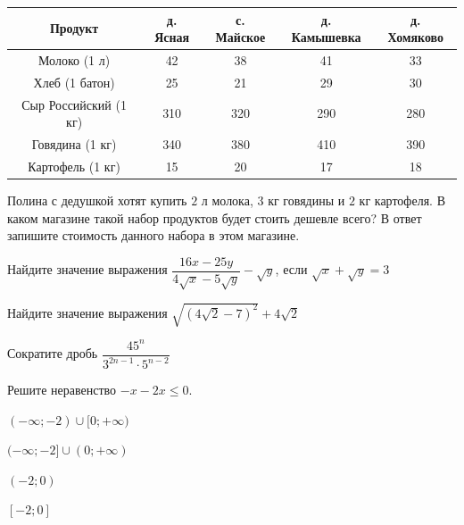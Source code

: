 \begin{class}[number=2]
\begin{listofex}
		\begin{center}
			\footnotesize
			\begin{tabular}{|c|c|c|c|c|}
				\hline
				\rowcolor{gray}\textbf{Продукт}&\textbf{д. Ясная}&\textbf{с. Майское}&\textbf{д. Камышевка}&\textbf{д. Хомяково}\\
				\hline
				Молоко (1 л)&42&38&41&33\\
				\hline
				Хлеб (1 батон)&25&21&29&30\\
				\hline
				Сыр Российский (1 кг)&310&320&290&280\\
				\hline
				Говядина (1 кг)&340&380&410&390\\
				\hline
				Картофель (1 кг)&15&20&17&18\\
				\hline
			\end{tabular}
		\end{center}
		Полина с дедушкой хотят купить \( 2 \) л молока, \( 3 \) кг говядины и \( 2 \) кг картофеля. В каком магазине такой набор продуктов будет стоить дешевле всего? В ответ запишите стоимость данного набора в этом магазине.
		\item {}
		\item {}
		\item {}
		\item Найдите значение выражения \( \dfrac{16x-25y}{4\sqrt{x}-5\sqrt{y}}-\sqrt{y} \), если \( \sqrt{x}+\sqrt{y}=3 \)
		\item Найдите значение выражения \( \sqrt{(4\sqrt{2}-7)^2}+4\sqrt{2} \)
		\item Сократите дробь \( \dfrac{45^n}{3^{2n-1}\cdot5^{n-2}} \)
		\item Решите неравенство \( -x-2x\le0 \).\\ \selectanswer
		\begin{enumcols}[itemcolumns=2]
			\item \( (-\infty;-2)\cup[0;+\infty) \)
			\item \( (-\infty;-2]\cup(0;+\infty) \)
			\item \( (-2;0) \)
			\item \( [-2;0] \)
		\end{enumcols}
	\end{listofex}
\end{class}
%
%
